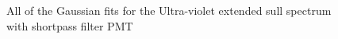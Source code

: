 \documentclass[aip, jmp, amsmath, amssymb, reprint, floatfix]{revtex4-1}
\begin{document}
\begin{figure}
  \qquad
  \qquad
\caption{All of the Gaussian fits for the Ultra-violet extended sull spectrum with shortpass filter PMT}
\end{figure}
\end{document}
